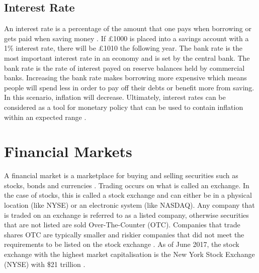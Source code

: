 \documentclass{UoYCSproject}
\begin{document}
\subsection{Interest Rate}
An interest rate is a percentage of the amount that one pays when borrowing or gets paid when saving money \cite{interestrate}. If \pounds 1000 is placed into a savings account with a 1\% interest rate, there will be \pounds 1010 the following year.  The bank rate is the most important interest rate in an economy and is set by the central bank. The bank rate is the rate of interest payed on reserve balances held by commercial banks. Increasing the bank rate makes borrowing more expensive which means people will spend less in order to pay off their debts or benefit more from saving. In this scenario, inflation will decrease. Ultimately, interest rates can be considered as a tool for monetary policy that can be used to contain inflation within an expected range \cite{christiano1999monetary}. 

\section{Financial Markets}
A financial market is a marketplace for buying and selling securities such as stocks, bonds and currencies \cite{financialmarket}. Trading occurs on what is called an exchange. In the case of stocks, this is called a stock exchange and can either be in a physical location (like NYSE) or an electronic system (like NASDAQ). Any company that is traded on an exchange is referred to as a listed company, otherwise securities that are not listed are sold Over-The-Counter (OTC). Companies that trade shares OTC are typically smaller and riskier companies that did not meet the requirements to be listed on the stock exchange \cite{stockexchange}. As of June 2017, the stock exchange with the highest market capitalisation is the New York Stock Exchange (NYSE) with \$21 trillion \cite{nyse}. 
\end{document}
